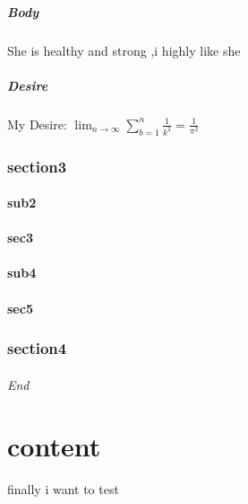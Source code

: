\documentclass[11pt,a4paper,twoside]{article}
\begin{document}
\subsubsection{Body}
She is healthy and strong ,i highly like she
\subsubsection{Desire}
My Desire:
$
\lim_{n \to \infty}
\sum_{b=1}^{n} \frac{1}{k^2}
=\frac{1}{\pi^2}
$
\section{section3}
\subsection{sub2}
\subsection{sec3}
\subsection{sub4}
\subsection{sec5}
\section{section4}
\paragraph{End}
\part{content}
finally\newpage
i want to test
\end{document}
